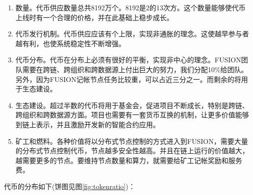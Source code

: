 \documentclass[a4paper,12pt]{article}
\begin{document}
\begin{enumerate}
\item 数量。代币供应数量总共8192万个。8192是2的13次方。这个数量能够使代币上线时有一个合理的价格，并在此基础上稳步成长。
\item 代币发行机制。代币供应应该有个上限，实现非通胀的理念。这使越早参与者越有利，也使系统稳定性不断增强。
\item 代币分布。代币在分布上必须有很好的平衡，实现非中心的理念。FUSION团队需要在跨链、跨组织和跨数据源上付出巨大的努力，我们分配10\%给团队。另外，因为FUSION记帐节点任务比较重，可以占近三分之一。而剩余的将用于生态建设。
\item 生态建设。超过半数的代币将用于基金会，促进项目不断成长，特别是跨链、跨组织和跨数据源方面。项目也需要有一套货币互换的机制，让更多价值能够到链上表示，并且激励开发新的智能合约应用。
\item 矿工和燃料。各种价值将以分布式节点控制的方式进入到FUSION，需要大量的分布式节点控制代币，节点越多安全性越高。并且在链上运行的价值越大，越需要更多的节点。要维持节点数量和算力，就需要给矿工记帐奖励和服务费。

\end{enumerate}

代币的分布如下(饼图见图\ref{fig:tokenratio})：


\end{document}
